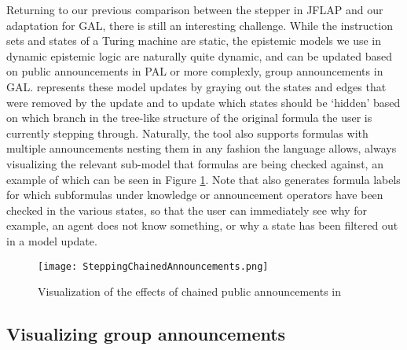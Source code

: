 Returning to our previous comparison between the stepper in JFLAP and our adaptation for GAL, there is still an interesting challenge. While the instruction sets and states of a Turing machine are static, the epistemic models we use in dynamic epistemic logic are naturally quite dynamic, and can be updated based on public announcements in PAL or more complexly, group announcements in GAL. \cname{} represents these model updates by graying out the states and edges that were removed by the update and to update which states should be `hidden' based on which branch in the tree-like structure of the original formula the user is currently stepping through. Naturally, the tool also supports formulas with multiple announcements nesting them in any fashion the language allows, always visualizing the relevant sub-model that formulas are being checked against, an example of which can be seen in Figure \ref{fig:stepperUpdates}. Note that \cname{} also generates formula labels for which subformulas under knowledge or announcement operators have been checked in the various states, so that the user can immediately see why for example, an agent does not know something, or why a state has been filtered out in a model update.

\begin{figure}[H]
	\texttt{[image: SteppingChainedAnnouncements.png]}
	\caption{Visualization of the effects of chained public announcements in \cname{}}
	\label{fig:stepperUpdates}
\end{figure}
 





\subsection{Visualizing group announcements}

